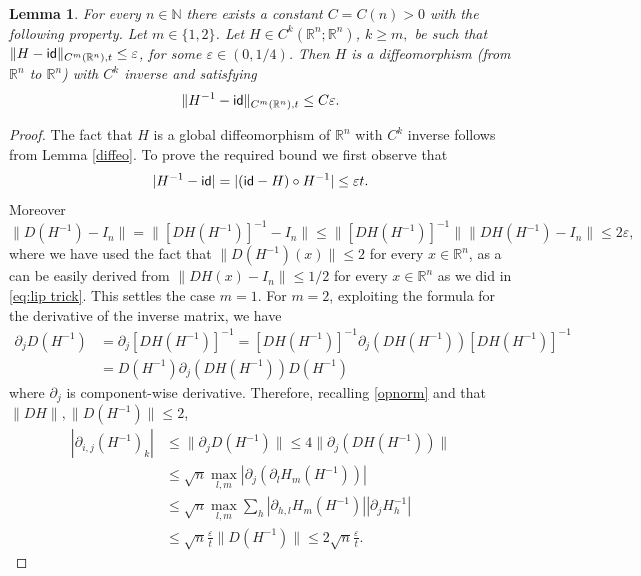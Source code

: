 \documentclass[11pt]{article}
\newcommand{\eps}{\varepsilon}
\newcommand{\rr}{\mathbb{R}}
\theoremstyle{plain}
\newtheorem{lemma}[theorem]{Lemma}
\theoremstyle{definition}
\numberwithin{equation}{section}
\begin{document}
\begin{lemma}\label{inversebound}
	For every $n \in \mathbb{N}$ there exists a constant $C=C(n)>0$ with the following property. Let $m \in \{1,2\}$. Let $H \in C^k(\rr^n;\rr^n)$, $k \ge m,$ be such that $\|H-{\sf{id}}\|_{C^m(\rr^n),t}\le \eps$, for some $\eps\in (0,1/4)$. Then $H$ is a  diffeomorphism  (from $\rr^n$ to $\rr^n$) with $C^k$ inverse and satisfying
	\[\|H^{-1}-{\sf{id}}\|_{C^m(\rr^n),t}\le C\eps.\]
\end{lemma}
\begin{proof}
	The fact that $H$ is a global  diffeomorphism  of $\rr^n$  with $C^k$ inverse follows from Lemma \ref{diffeo}. To prove the required bound we first observe that
	\[ |H^{-1}-{\sf{id}}|=|({\sf{id}}-H)\circ H^{-1}|\le \eps t.\]
	Moreover 
	\[ \|D(H^{-1})-I_n\|=\|[DH(H^{-1})]^{-1}-I_n\|\le \|[DH(H^{-1})]^{-1}\| \|DH(H^{-1})-I_n\|\le 2\eps,\]
	where we have used the fact that $\|D(H^{-1})(x)\|\le 2$ for every $x\in \rr^n$, as a can be easily derived from $\|DH(x)-I_n\|\le 1/2$ for every $x\in \rr^n$ as we did in \eqref{eq:lip trick}. This settles the case $m=1.$
	For $m=2$, exploiting the formula for the derivative of the inverse matrix, we have
	\begin{align*}
		\partial_j D(H^{-1})&=\partial_j[DH(H^{-1})]^{-1} =[DH(H^{-1})]^{-1} \partial_j (DH(H^{-1}))[DH(H^{-1})]^{-1}\\
		&=D(H^{-1}) \partial_j (DH(H^{-1}))D(H^{-1})
	\end{align*}
	where $\partial_j$ is component-wise derivative. Therefore, recalling \eqref{opnorm} and that $\|DH\|,\|D(H^{-1})\|\le 2$, 
	\begin{align*}
		|\partial_{i,j}(H^{-1})_k|&\le \|\partial_j D(H^{-1})\|\le 4\| \partial_j (DH(H^{-1}))\| \\
		&\le\sqrt{n}\max_{l,m} |\partial_j(\partial_lH_m(H^{-1}))|\\
		&\le \sqrt{n} \max_{l,m} \sum_h |\partial_{h,l}H_m(H^{-1})||\partial_{j}H^{-1}_h|\\
		&\le \sqrt{n}\frac{\eps}{t} \|D(H^{-1})\|\le 2 \sqrt{n}\frac{\eps}{t}.
	\end{align*}
\end{proof}
\end{document}

